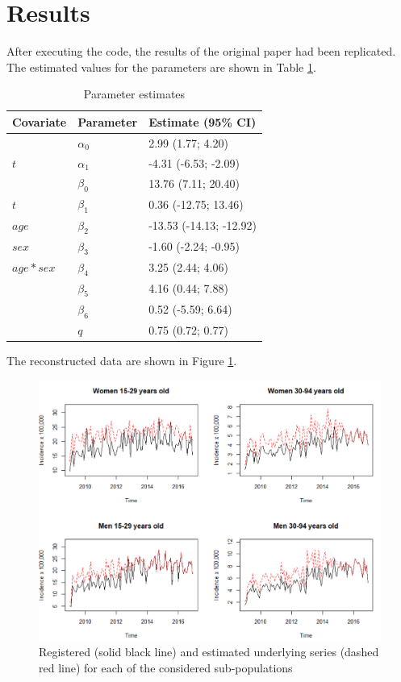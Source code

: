 \documentclass[acmsmall, nonacm]{acmart}
\begin{document}
\section{Results}
After executing the code, the results of the original paper \cite{Morina2021} had been replicated. The estimated values for the parameters are shown in Table \ref{tab:1}.
\begin{table}[h!]
    \centering
    \caption{Parameter estimates \label{tab:1}}
    \begin{tabular}{lll}
    \hline
    \textbf{Covariate} & \textbf{Parameter} & \textbf{Estimate (95\% CI)} \\
    \hline
     & $\alpha_0$ & 2.99 (1.77; 4.20) \\
        $t$ & $\alpha_1$ & -4.31 (-6.53; -2.09) \\
        & $\beta_0$ & 13.76 (7.11; 20.40) \\
        $t$ & $\beta_1$ & 0.36 (-12.75; 13.46) \\
        $age$ & $\beta_2$ & -13.53 (-14.13; -12.92) \\
        $sex$ & $\beta_3$ & -1.60 (-2.24; -0.95) \\
        $age \ast sex$ & $\beta_4$ & 3.25 (2.44; 4.06) \\
         & $\beta_5$ & 4.16 (0.44; 7.88) \\
         & $\beta_6$ & 0.52 (-5.59; 6.64) \\
         & $q$ & 0.75 (0.72; 0.77) \\
    \hline
    \end{tabular}
\end{table}
The reconstructed data are shown in Figure \ref{raro}.
\begin{figure}
    \centering
    \includegraphics[width=0.8\linewidth]{raro.png}
    \caption{Registered (solid black line) and estimated underlying series (dashed red line) for each of the considered sub-populations}
    \label{raro}
\end{figure}
\end{document}

